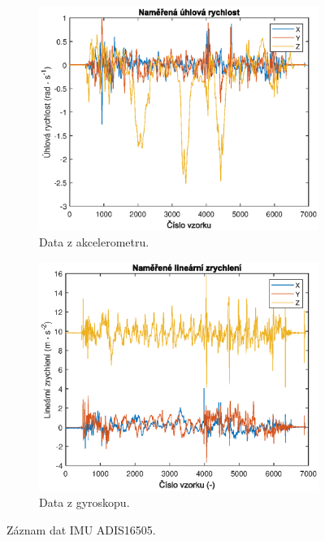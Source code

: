 \begin{figure}[h]
     \centering
     \begin{subfigure}[b]{0.49\textwidth}
         \centering
         \includegraphics[width=\textwidth]{obrazky/matlab/1measAngularVel}
         \caption{Data z akcelerometru.}     
     \end{subfigure}
     \hfill
     \centering
     \begin{subfigure}[b]{0.49\textwidth}
         \centering
         \includegraphics[width=\textwidth]{obrazky/matlab/1measAccel}
         \caption{Data z gyroskopu.}   
     \end{subfigure}

        \caption{Záznam dat IMU ADIS16505.}
        \label{fig:IMURawData}
\end{figure}

